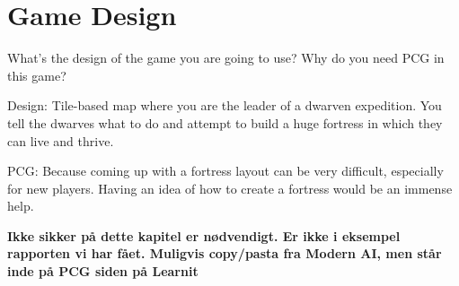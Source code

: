 \section{Game Design}
\label{03}

What’s the design of the game you are going to use? Why do you need PCG in this game?

Design: Tile-based map where you are the leader of a dwarven expedition. You tell the dwarves what to do and attempt to build a huge fortress in which they can live and thrive.

PCG: Because coming up with a fortress layout can be very difficult, especially for new players. Having an idea of how to create a fortress would be an immense help.

\textbf{Ikke sikker på dette kapitel er nødvendigt. Er ikke i eksempel rapporten vi har fået. Muligvis copy/pasta fra Modern AI, men står inde på PCG siden på Learnit}